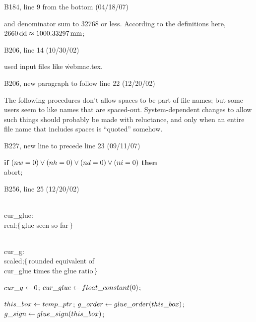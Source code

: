 {{\bugonpage B184, line 9 from the bottom (04/18/07)

\tenpoint\noindent
and denominator sum to 32768 or less.
According to the definitions here, $\rm2660\,dd\approx1000.33297\,mm$;\kern-6.6pt\cutpar

\bugonpage B206, line 14 (10/30/02)

\tenpoint\noindent
used input files like \.{webmac.tex}.

\bugonpage B206, new paragraph to follow line 22 (12/20/02)

\tenpoint\noindent\quad
The following procedures don't allow spaces to be part of
file names; but some users seem to like names that are spaced-out.
System-dependent changes to allow such things should probably
be made with reluctance, and only when an entire file name that
includes spaces is ``quoted'' somehow.

\bugonpage B227, new line to precede line 23 (09/11/07)

\ninepoint\noindent
{\bf if} $(\\{nw}=0)\lor(\\{nh}=0)\lor(\\{nd}=0)\lor(\\{ni}=0)$
 {\bf then} \\{abort};

\bugonpage B256, line 25 (12/20/02)

\ninepoint\noindent
\qquad\\{cur\_glue}: \\{real};\quad$\{\,$glue seen so far$\,\}$\par\noindent
\qquad\\{cur\_g}: \\{scaled};\quad$\{\,$rounded
  equivalent of \\{cur\_glue} times the glue ratio$\,\}$\par\noindent
{} $\\{cur\_g}\gets0$;
  $\\{cur\_glue}\gets\\{float\_constant}(0)$;\par\noindent
\quad$\\{this\_box}\gets\\{temp\_ptr}$;
 $\\{g\_order}\gets\\{glue\_order}(\\{this\_box})$;
 $\\{g\_sign}\gets\\{glue\_sign}(\\{this\_box})$;

}}

